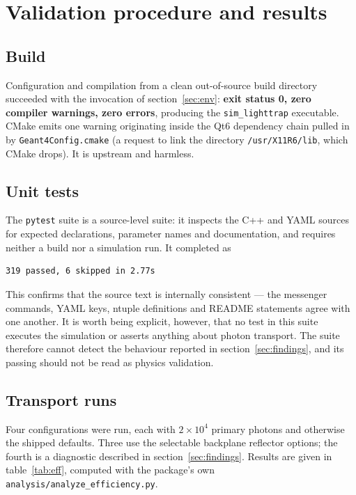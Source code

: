 \documentclass[a4paper,11pt]{article}
\begin{document}
\section{Validation procedure and results}
\label{sec:results}

\subsection{Build}

Configuration and compilation from a clean out-of-source build directory
succeeded with the invocation of section~\ref{sec:env}: \textbf{exit status 0,
zero compiler warnings, zero errors}, producing the \texttt{sim\_lighttrap}
executable. CMake emits one warning originating inside the Qt6 dependency chain
pulled in by \texttt{Geant4Config.cmake} (a request to link the directory
\texttt{/usr/X11R6/lib}, which CMake drops). It is upstream and harmless.

\subsection{Unit tests}

The \texttt{pytest} suite is a source-level suite: it inspects the C++ and YAML
sources for expected declarations, parameter names and documentation, and
requires neither a build nor a simulation run. It completed as

\begin{lstlisting}
319 passed, 6 skipped in 2.77s
\end{lstlisting}

This confirms that the source text is internally consistent --- the messenger
commands, YAML keys, ntuple definitions and README statements agree with one
another. It is worth being explicit, however, that no test in this suite
executes the simulation or asserts anything about photon transport. The suite
therefore cannot detect the behaviour reported in section~\ref{sec:findings}, and
its passing should not be read as physics validation.

\subsection{Transport runs}

Four configurations were run, each with $2\times10^{4}$ primary photons and
otherwise the shipped defaults. Three use the selectable backplane reflector
options; the fourth is a diagnostic described in
section~\ref{sec:findings}. Results are given in table~\ref{tab:eff}, computed
with the package's own \texttt{analysis/analyze\_efficiency.py}.
\end{document}
